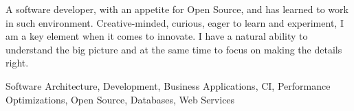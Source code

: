 \documentclass[9pt]{developercv} %
\begin{document}
\vspace{0.5cm}



\begin{minipage}[t]{0.42\textwidth} %
	\vspace{-\baselineskip} %
	
  {A software developer, with an appetite for Open Source, and has learned to
  work in such environment. Creative-minded, curious, eager to learn and
  experiment, I am a key element when it comes to innovate. I have a natural
  ability to understand the big picture and at the same time to focus on
  making the details right.
  }
\end{minipage}
\hfill %
\begin{minipage}[t]{0.42\textwidth}
	\vspace{-\baselineskip} %
  {Software Architecture, Development, Business Applications,
    CI, Performance Optimizations, Open Source, Databases,
    Web Services}\\

  \begin{center}
  \end{center}
\end{minipage}


\end{document}
